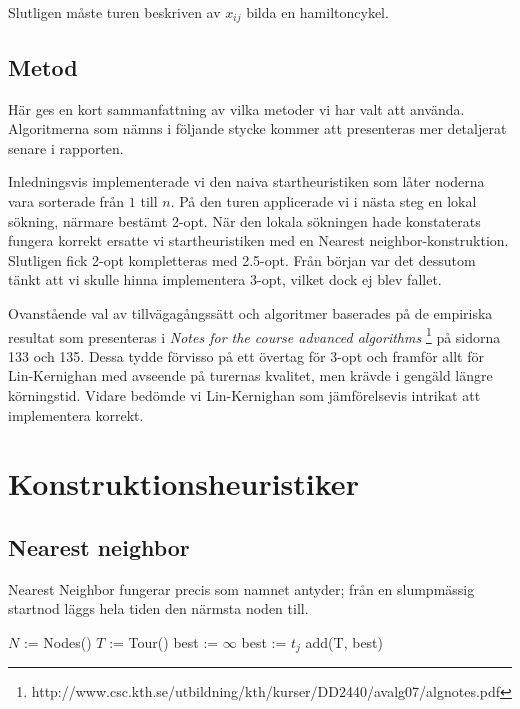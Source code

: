 \documentclass[a4paper,12pt]{article}
\renewcommand{\*}{\ensuremath{\cdot}}
\begin{document}

Slutligen måste turen beskriven av $x_{ij}$ bilda en hamiltoncykel.

\subsection{Metod}

Här ges en kort sammanfattning av vilka metoder vi har valt att använda.
Algoritmerna som nämns i följande stycke kommer att presenteras mer detaljerat
senare i rapporten.

Inledningsvis implementerade vi den naiva startheuristiken som låter noderna
vara sorterade från $1$ till $n$. På den turen applicerade vi i nästa steg en
lokal sökning, närmare bestämt 2-opt. När den lokala sökningen hade konstaterats
fungera korrekt ersatte vi startheuristiken med en Nearest
neighbor-konstruktion. Slutligen fick 2-opt kompletteras med 2.5-opt. Från
början var det dessutom tänkt att vi skulle hinna implementera 3-opt, vilket
dock ej blev fallet.

Ovanstående val av tillvägagångssätt och algoritmer baserades på de empiriska
resultat som presenteras i \textit{Notes for the course advanced algorithms}
\footnote{http://www.csc.kth.se/utbildning/kth/kurser/DD2440/avalg07/algnotes.pdf}
på sidorna 133 och 135. Dessa tydde förvisso på ett övertag för 3-opt och
framför allt för Lin-Kernighan med avseende på turernas kvalitet, men krävde i
gengäld längre körningstid. Vidare bedömde vi Lin-Kernighan som jämförelsevis
intrikat att implementera korrekt.

\section{Konstruktionsheuristiker}

\subsection{Nearest neighbor}

Nearest Neighbor fungerar precis som namnet antyder; från en slumpmässig
startnod läggs hela tiden den närmsta noden till.

\begin{algorithmic}
    \STATE $N$ := Nodes()
    \STATE $T$ := Tour()
        \STATE best := $\infty$
                \STATE best := $t_j$
                \STATE add(T, best)
            \ENDIF
        \ENDFOR
    \ENDFOR
\end{algorithmic}
\end{document}

